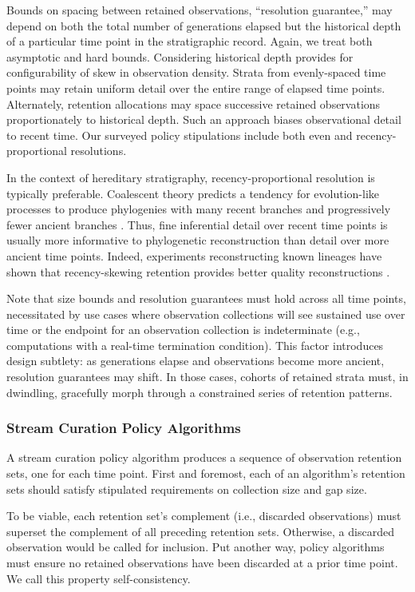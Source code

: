 Bounds on spacing between retained observations, ``resolution guarantee,'' may depend on both the total number of generations elapsed but the historical depth of a particular time point in the stratigraphic record.
Again, we treat both asymptotic and hard bounds.
Considering historical depth provides for configurability of skew in observation density.
Strata from evenly-spaced time points may retain uniform detail over the entire range of elapsed time points.
Alternately, retention allocations may space successive retained observations proportionately to historical depth.
Such an approach biases observational detail to recent time.
Our surveyed policy stipulations include both even and recency-proportional resolutions.

In the context of hereditary stratigraphy, recency-proportional resolution is typically preferable.
Coalescent theory predicts a tendency for evolution-like processes to produce phylogenies with many recent branches and progressively fewer ancient branches \citep{nordborgCoalescentTheory2019, berestyckiRecentProgressCoalescent2009}.
Thus, fine inferential detail over recent time points is usually more informative to phylogenetic reconstruction than detail over more ancient time points.
Indeed, experiments reconstructing known lineages have shown that recency-skewing retention provides better quality reconstructions \citep{moreno2022hereditary}.

Note that size bounds and resolution guarantees must hold across all time points, necessitated by use cases where observation collections will see sustained use over time or the endpoint for an observation collection is indeterminate (e.g., computations with a real-time termination condition).
This factor introduces design subtlety: as generations elapse and observations become more ancient, resolution guarantees may shift.
In those cases, cohorts of retained strata must, in dwindling, gracefully morph through a constrained series of retention patterns.

\subsubsection{Stream Curation Policy Algorithms}

A stream curation policy algorithm produces a sequence of observation retention sets, one for each time point.
First and foremost, each of an algorithm's retention sets should satisfy stipulated requirements on collection size and gap size.

To be viable, each retention set's complement (i.e., discarded observations) must superset the complement of all preceding retention sets.
Otherwise, a discarded observation would be called for inclusion.
Put another way, policy algorithms must ensure no retained observations have been discarded at a prior time point.
We call this property self-consistency.

